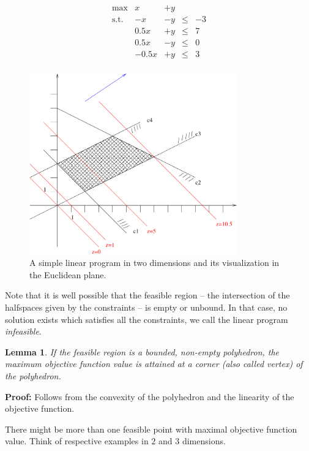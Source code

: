 \documentclass{article}
\newtheorem{lemma}{Lemma}
\begin{document}
\begin{figure}[t]
\begin{minipage}{4cm}
\[
\begin{matrix}
	\max		& x	&+	y	&&\\ 
	\mbox{s.t.}	&-x	&	-y	&\leq&-3\\ 
			&0.5x	&	+y	&\leq&7\\ 
			&0.5x	&	-y	& \leq&0\\
			&-0.5x	&	+y	& \leq&3\\
\end{matrix}
\]
\end{minipage}
\hspace{1cm}
\begin{minipage}{10cm}
\includegraphics[width=9cm]{Figs/GeomIntuition.pdf}
\end{minipage}
\caption{A simple linear program in two dimensions and its visualization in the
	Euclidean plane.\label{fig:GeomIntuition}}
\end{figure}

Note that it is well possible that the feasible region -- the intersection
of the halfspaces given by the constraints -- is empty or unbound. In that case, no solution
exists which satisfies all the constraints, we call the linear program \emph{infeasible}.

\begin{lemma}
If the feasible region is a bounded, non-empty polyhedron, 
the maximum objective function value is 	attained at a corner (also called \emph{vertex})
 of the polyhedron.
\end{lemma}
{\bf Proof:} Follows from the convexity of the polyhedron and the 
linearity of the objective function.

There might be more than one feasible point with maximal objective function value. Think
of respective examples in $2$ and $3$ dimensions.
\end{document}

